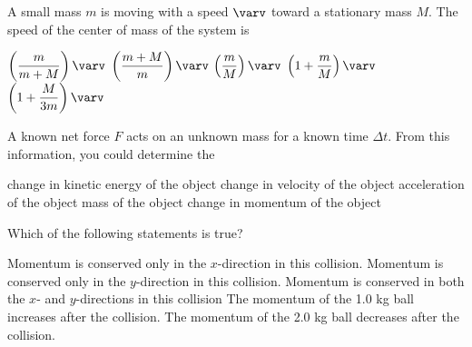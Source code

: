 \documentclass{../../../oss-classkick-exam}
\begin{document}
\begin{multicols*}{2}
\begin{questions}
    \question A small mass $m$ is moving with a speed $\varv$ toward a
    stationary mass $M$. The speed of the center of mass of the system is
    \begin{choices}
      \choice $\left(\dfrac{m}{m+M}\right)\varv$
      \choice $\left(\dfrac{m+M}{m}\right)\varv$
      \choice $\left(\dfrac{m}{M}\right)\varv$
      \choice $\left(1+\dfrac{m}{M}\right)\varv$
      \choice $\left(1+\dfrac{M}{3m}\right)\varv$
    \end{choices}

    \question A known net force $F$ acts on an unknown mass for a known time
    $\Delta t$. From this information, you could determine the
    \begin{choices}
      \choice change in kinetic energy of the object
      \choice change in velocity of the object
      \choice acceleration of the object
      \choice mass of the object
      \choice change in momentum of the object
    \end{choices}
    \vspace{.7in}
    

    \question Which of the following statements is true?
    \label{bfa1}
    \begin{choices}    
      \choice Momentum is conserved only in the $x$-direction in this collision.
      \choice Momentum is conserved only in the $y$-direction in this collision.
      \choice Momentum is conserved in both the $x$- and $y$-directions in this
      collision
      \choice The momentum of the 1.0 kg ball increases after the collision.
      \choice The momentum of the 2.0 kg ball decreases after the collision.
    \end{choices}
    \vspace{.7in}
    

\end{questions}
\end{multicols*}
\end{document}
